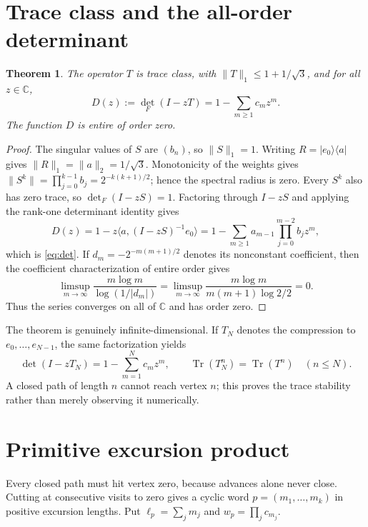 \documentclass[11pt]{article}
\newtheorem{theorem}{Theorem}
\newcommand{\Tr}{\operatorname{Tr}}
\begin{document}
\section{Trace class and the all-order determinant}
\begin{theorem}\label{thm:det}
The operator $T$ is trace class, with
$\lVert T\rVert_1\le1+1/\sqrt3$, and for all $z\in\mathbb C$,
\begin{equation}\label{eq:det}
 D(z):=\det_{\!F}(I-zT)=1-\sum_{m\ge1}c_mz^m.
\end{equation}
The function $D$ is entire of order zero.
\end{theorem}
\begin{proof}
The singular values of $S$ are $(b_n)$, so $\lVert S\rVert_1=1$.
Writing $R=|e_0\rangle\langle a|$ gives
$\lVert R\rVert_1=\lVert a\rVert_2=1/\sqrt3$.  Monotonicity of the weights
gives
$\lVert S^k\rVert=\prod_{j=0}^{k-1}b_j=2^{-k(k+1)/2}$; hence the spectral
radius is zero.  Every $S^k$ also has zero trace, so
$\det_F(I-zS)=1$.  Factoring through $I-zS$ and applying the rank-one
determinant identity gives
\[
 D(z)=1-z\langle a,(I-zS)^{-1}e_0\rangle
 =1-\sum_{m\ge1}a_{m-1}\prod_{j=0}^{m-2}b_jz^m,
\]
which is \eqref{eq:det}.  If $d_m=-2^{-m(m+1)/2}$ denotes its nonconstant
coefficient, then the coefficient characterization of entire order gives
\[
 \limsup_{m\to\infty}
 \frac{m\log m}{\log(1/|d_m|)}
 =\limsup_{m\to\infty}
 \frac{m\log m}{m(m+1)\log2/2}=0.
\]
Thus the series converges on all of $\mathbb C$ and has order zero.
\end{proof}

The theorem is genuinely infinite-dimensional.  If $T_N$ denotes the
compression to $e_0,\ldots,e_{N-1}$, the same factorization yields
\begin{equation}\label{eq:finite}
 \det(I-zT_N)=1-\sum_{m=1}^{N}c_mz^m,
 \qquad \Tr(T_N^n)=\Tr(T^n)\quad(n\le N).
\end{equation}
A closed path of length $n$ cannot reach vertex $n$; this proves the trace
stability rather than merely observing it numerically.

\section{Primitive excursion product}
Every closed path must hit vertex zero, because advances alone never close.
Cutting at consecutive visits to zero gives a cyclic word
$p=(m_1,\ldots,m_k)$ in positive excursion lengths.  Put
$\ell_p=\sum_jm_j$ and $w_p=\prod_jc_{m_j}$.
\end{document}
